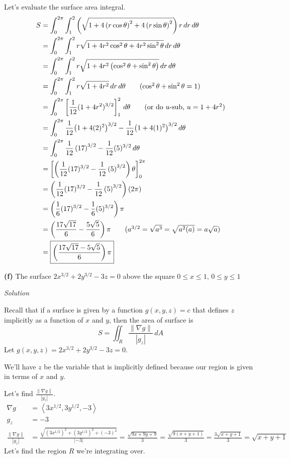 \documentclass{article}
\newcommand{\lrp}[1]{\left( #1 \right)}
\newcommand{\lra}[1]{\left\langle #1 \right\rangle}
\newcommand{\lrb}[1]{\left[ #1 \right]}
\newcommand{\norm}[1]{\left\lVert #1 \right\rVert}
\newcommand{\Solution}{\textit{Solution}}
\begin{document}
Let's evaluate the surface area integral.
\begin{align*}
    S&=\int_0^{2\pi}\int_1^2 \lrp{\sqrt{1+4\lrp{r\cos \theta}^2+4\lrp{r\sin \theta}^2}}r\,dr\,d\theta\\
    &=\int_0^{2\pi}\int_1^2 r\sqrt{1+4r^2\cos^2\theta+4r^2\sin^2\theta}\,dr\,d\theta\\
    &=\int_0^{2\pi}\int_1^2 r\sqrt{1+4r^2\lrp{\cos ^2 \theta+\sin ^2 \theta}}\,dr\,d\theta\\
    &=\int_0^{2\pi}\int_1^2 r\sqrt{1+4r^2}\,dr\,d\theta\tag{$\cos^2\theta+\sin^2\theta=1$}\\
    &=\int_0^{2\pi}\lrb{\frac{1}{12}(1+4r^2)^{3/2}}_1^2\,d\theta\tag{or do $u$-sub, $u=1+4r^2$}\\
    &=\int_0^{2\pi}\frac{1}{12}\big(1+4(2)^2\big)^{3/2}-\frac{1}{12}\big(1+4(1)^2\big)^{3/2}\,d\theta\\
    &=\int_0^{2\pi}\frac{1}{12}\lrp{17}^{3/2}-\frac{1}{12}(5)^{3/2}\,d\theta\\
    &=\lrb{\lrp{\frac{1}{12}(17)^{3/2}-\frac{1}{12}\lrp{5}^{3/2}}\theta}_0^{2\pi}\\
    &=\lrp{\frac{1}{12}(17)^{3/2}-\frac{1}{12}\lrp{5}^{3/2}}\lrp{2\pi}\\
    &=\lrp{\frac{1}{6}(17)^{3/2}-\frac{1}{6}(5)^{3/2}}\pi\\
    &={\lrp{\frac{17\sqrt{17}}{6}-\frac{5\sqrt{5}}{6}}\pi}\tag{$a^{3/2}=\sqrt{a^3}=\sqrt{a^2(a)}=a\sqrt{a}$}\\
    &=\boxed{\lrp{\frac{17\sqrt{17}-5\sqrt{5}}{6}}\pi}
\end{align*}
{}\textbf{(f)} The surface $2x^{3/2}+2y^{3/2}-3z=0$ above the square $0\leq x\leq 1$, $0\leq y\leq 1$

\Solution

Recall that if a surface is given by a function $g(x,y,z)=c$ that defines $z$ implicitly as a function of $x$ and $y$, then the area of surface is
\begin{equation*}
    S=\iint_R \frac{\norm{\nabla g}}{\left| g_z\right|}\,dA
\end{equation*}
Let $g(x,y,z)=2x^{3/2}+2y^{3/2}-3z=0$. 

We'll have $z$ be the variable that is implicitly defined because our region is given in terms of $x$ and $y$.

Let's find $\displaystyle\frac{\norm{\nabla g}}{\left| g_z\right|} $.
\begin{align*}
    \nabla g&=\lra{3x^{1/2},3y^{1/2},-3}\\
    g_z&=-3\\
    \frac{\norm{\nabla g}}{\left|g_z\right|}&=\frac{\sqrt{\lrp{3x^{1/2}}^2+\lrp{3y^{1/2}}^2+(-3)^2}}{\left|-3\right|}=\frac{\sqrt{9x+9y+9}}{3}=\frac{\sqrt{9(x+y+1)}}{3}=\frac{3\sqrt{x+y+1}}{3}=\sqrt{x+y+1}
\end{align*}
Let's find the region $R$ we're integrating over.
\end{document}

